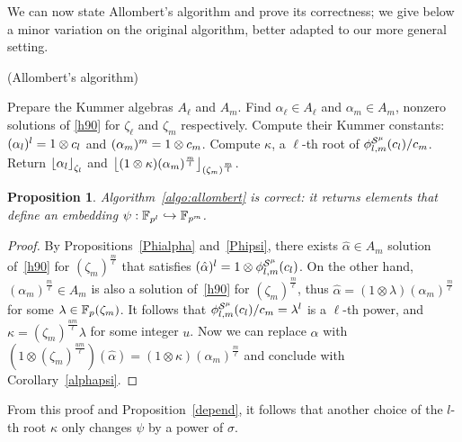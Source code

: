 \documentclass{sig-alternate}
\newtheorem{proposition}[theorem]{Proposition}
\begin{document}
We can now state Allombert's algorithm and prove its correctness; we
give below a minor variation on the original algorithm, better adapted
to our more general setting.
\begin{algorithm}
  \caption{(Allombert's algorithm)}
  \label{algo:allombert}
  \begin{algorithmic}[1]
  \STATE Prepare the Kummer algebras $A_\ell$ and $A_m$.
  \STATE Find $\alpha_\ell\in A_\ell$ and $\alpha_m\in A_m$, nonzero solutions of \eqref{h90} for $\zeta_\ell$
  and $\zeta_m$ respectively.
  \STATE Compute their Kummer constants: $(\alpha_l)^l=1\otimes c_l$ and
  $(\alpha_m)^m=1\otimes c_m$.
  \STATE Compute $\kappa$, a $\ell$-th root of ${\phi^{\mathcal{S}^\mu}_{{l},{m}}}(c_l)/c_m$.
  \STATE Return $\left\lfloor \alpha_{l} \right\rfloor_{\zeta_l}$ and $\left\lfloor (1\otimes\kappa)(\alpha_m)^{\frac{m}{l}} \right\rfloor_{(\zeta_m)^{\frac{m}{l}}}$.
  \end{algorithmic}
\end{algorithm}
\begin{proposition}
  Algorithm~\ref{algo:allombert} is correct: it returns elements that define an
  embedding $\psi:\mathbb{F}_{p^l}\hookrightarrow\mathbb{F}_{p^m}$.
\end{proposition}
\begin{proof}
By Propositions~\ref{Phialpha} and~\ref{Phipsi}, there exists $\hat{\alpha}\in A_m$
solution of~\eqref{h90} for $(\zeta_m)^{\frac{m}{\ell}}$ that satisfies $(\hat{\alpha})^l=1\otimes{\phi^{\mathcal{S}^\mu}_{{l},{m}}}(c_l)$.
On the other hand, $(\alpha_m)^{\frac{m}{\ell}}\in A_m$ is also a solution of~\eqref{h90} for $(\zeta_m)^{\frac{m}{\ell}}$,
thus $\hat{\alpha}=(1\otimes\lambda)(\alpha_m)^{\frac{m}{\ell}}$ for some $\lambda\in\mathbb{F}_{p}(\zeta_m)$.
It follows that ${\phi^{\mathcal{S}^\mu}_{{l},{m}}}(c_l)/c_m=\lambda^l$ is a $\ell$-th power,
and $\kappa = (\zeta_{m})^{\frac{um}{\ell}}\lambda$ for some integer $u$.
Now we can replace $\hat{\alpha}$
with $(1\otimes(\zeta_{m})^{\frac{um}{\ell}})(\hat{\alpha})=(1\otimes\kappa)(\alpha_m)^{\frac{m}{\ell}}$
and conclude with Corollary~\ref{alphapsi}.
\end{proof}
From this proof and Proposition~\ref{depend}, it follows that another choice of the $l$-th root $\kappa$
only changes $\psi$ by a power of $\sigma$.
    
\end{document}
